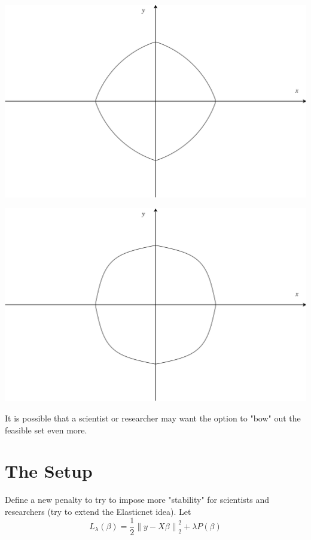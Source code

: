 \documentclass[10pt, reqno]{article}
\numberwithin{equation}{section}
\newcommand{\norm}[1]{\left\lVert#1\right\rVert}
\begin{document}
\vspace{.5cm}
\begin{center}
\begin{minipage}{.5\textwidth}
  \centering
  \includegraphics[width=.9\linewidth]{elasticnet.png}
\end{minipage}%
\begin{minipage}{.5\textwidth}
  \centering
  \includegraphics[width=.9\linewidth]{new_penalty_4_moment.png}
\end{minipage}
\end{center}
\vspace{.5cm}

It is possible that a scientist or researcher may want the option to "bow" out the feasible set even more.

\newpage
\section*{The Setup}

Define a new penalty to try to impose more "stability" for scientists and researchers (try to extend the Elasticnet \cite{elasticnet} idea). Let
\[
L_{\lambda}(\beta) = \frac{1}{2} \norm{y - X \beta}_2^2 + \lambda P(\beta)
\]
\end{document}
